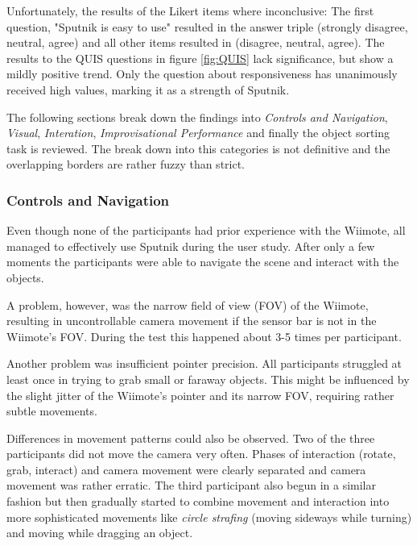 \documentclass[10pt,a4paper]{scrartcl}
\begin{document}
Unfortunately, the results of the Likert items where inconclusive: The first question, "Sputnik is easy to use" resulted in the answer triple (strongly disagree, neutral, agree) and all other items resulted in (disagree, neutral, agree). The results to the QUIS questions in figure \ref{fig:QUIS} lack significance, but show a mildly positive trend. Only the question about responsiveness has unanimously received high values, marking it as a strength of Sputnik.

The following sections break down the findings into \emph{Controls and Navigation}, \emph{Visual}, \emph{Interation}, \emph{Improvisational Performance} and finally the object sorting task is reviewed. The break down into this categories is not definitive and the overlapping borders are rather fuzzy than strict.


\subsubsection{Controls and Navigation}
Even though none of the participants had prior experience with the Wiimote, all managed to effectively use Sputnik during the user study. After only a few moments the participants were able to navigate the scene and interact with the objects. 

A problem, however, was the narrow field of view (FOV) of the Wiimote, resulting in uncontrollable camera movement if the sensor bar is not in the Wiimote's FOV. During the test this happened about 3-5 times per participant.

Another problem was insufficient pointer precision. All participants struggled at least once in trying to grab small or faraway objects. This might be influenced by the slight jitter of the Wiimote's pointer and its narrow FOV, requiring rather subtle movements.

Differences in movement patterns could also be observed. Two of the three participants did not move the camera very often. Phases of interaction (rotate, grab, interact) and camera movement were clearly separated and camera movement was rather erratic. The third participant also begun in a similar fashion but then gradually started to combine movement and interaction into more sophisticated movements like \emph{circle strafing} (moving sideways while turning) and moving while dragging an object.
\end{document}
